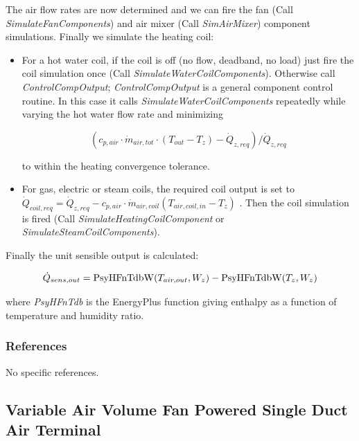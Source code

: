 The air flow rates are now determined and we can fire the fan (Call \emph{SimulateFanComponents}) and air mixer (Call \emph{SimAirMixer}) component simulations. Finally we simulate the heating coil:

\begin{itemize}
  \item
    For a hot water coil, if the coil is off (no flow, deadband, no load) just fire the coil simulation once (Call \emph{SimulateWaterCoilComponents}). Otherwise call \emph{ControlCompOutput}; \emph{ControlCompOutput} is a general component control routine. In this case it calls \emph{SimulateWaterCoilComponents} repeatedly while varying the hot water flow rate and minimizing

\begin{equation}
({c_{p,air}}\cdot {\dot m_{air,tot}}\cdot ({T_{out}} - {T_z}) - {\dot Q_{z,req}})/{\dot Q_{z,req}}
\end{equation}

to within the heating convergence tolerance.

  \item
    For gas, electric or steam coils, the required coil output is set to \({\dot Q_{coil,req}} = {\dot Q_{z,req}} - {c_{p,air}}\cdot {\dot m_{air,coil}}({T_{air,coil,in}} - {T_z})\) . Then the coil simulation is fired (Call \emph{SimulateHeatingCoilComponent} or \emph{SimulateSteamCoilComponents}).
\end{itemize}

Finally the unit sensible output is calculated:

\begin{equation}
{\dot Q_{sens,out}} = {\rm{PsyHFnTdbW}}({T_{air,out}},{W_z}) - {\rm{PsyHFnTdbW(}}{T_z},{W_z})
\end{equation}

where \emph{PsyHFnTdb} is the EnergyPlus function giving enthalpy as a function of temperature and humidity ratio.

\subsubsection{References}\label{references-2}

No specific references.

\subsection{Variable Air Volume Fan Powered Single Duct Air Terminal}\label{variable-air-volume-fan-powered-single-duct-air-terminal}

